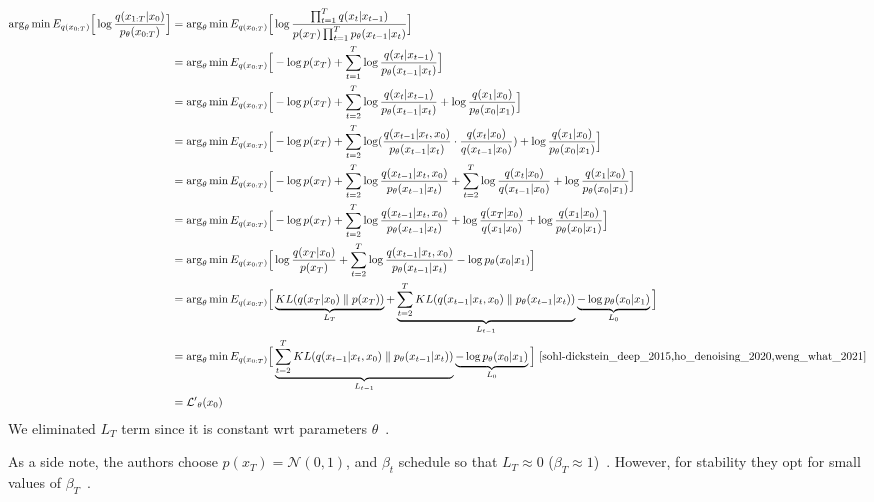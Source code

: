 \documentclass{article}
\numberwithin{equation}{subsection}
\begin{document}
\begin{align}
\arg_\theta \min E_{q(x_{0:T})}\Big[\log\frac{q(x_{1:T}|x_0)}{p_\theta(x_{0:T})}\Big] &= \arg_\theta \min E_{q(x_{0:T})}\Big[ \log\frac{\prod_{t=1}^T q(x_t|x_{t-1})}{ p(x_T) \prod_{t=1}^T p_\theta(x_{t-1} |x_t) }\Big] \\
&= \arg_\theta \min E_{q(x_{0:T})}\Big[ -\log p(x_T) + \sum_{t=1}^T \log \frac{q(x_t|x_{t-1})}{p_\theta(x_{t-1} |x_t)}\Big] \\
&= \arg_\theta \min E_{q(x_{0:T})}\Big[ -\log p(x_T) + \sum_{t=2}^T \log \frac{q(x_t|x_{t-1})}{p_\theta(x_{t-1} |x_t)} + \log\frac{q(x_1 |x_0)}{p_\theta(x_0 |x_1)}\Big]\\
&= \arg_\theta \min E_{q(x_{0:T})}\Big[ -\log p(x_T) + \sum_{t=2}^T \log ( \frac{q(x_{t-1} |x_t, x_0)}{p_\theta(x_{t-1} |x_t)}\cdot \frac{q(x_t |x_0)}{q(x_{t-1}|x_0)} ) + \log \frac{q(x_1 |x_0)}{p_\theta(x_0 |x_1)} \Big]\label{x0cond}\\
&= \arg_\theta \min E_{q(x_{0:T})}\Big[ -\log p(x_T) + \sum_{t=2}^T \log \frac{q(x_{t-1} |x_t, x_0)}{p_\theta(x_{t-1} |x_t)} + \sum_{t=2}^T \log \frac{q(x_t |x_0)}{q(x_{t-1} |x_0)} + \log\frac{q(x_1 |x_0)}{p_\theta(x_0 |x_1)}\Big] \\
&= \arg_\theta \min E_{q(x_{0:T})}\Big[-\log p(x_T) + \sum_{t=2}^T \log \frac{q(x_{t-1} |x_t, x_0)}{p_\theta(x_{t-1} |x_t)} + \log\frac{q(x_T |x_0)}{q(x_1 |x_0)} + \log \frac{q(x_1 |x_0)}{p_\theta(x_0 |x_1)}\Big]\\
&= \arg_\theta \min E_{q(x_{0:T})}\Big[\log\frac{q(x_T |x_0)}{p(x_T)} + \sum_{t=2}^T \log \frac{q(x_{t-1} |x_t, x_0)}{p_\theta(x_{t-1} |x_t)} - \log p_\theta(x_0 |x_1)\Big] \\
&= \arg_\theta \min E_{q(x_{0:T})}\Big[\underbrace{KL(q(x_T |x_0) \parallel p(x_T))}_{L_T} + \underbrace{\sum_{t=2}^T KL(q(x_{t-1} |x_t, x_0) \parallel p_\theta(x_{t-1} |x_t))}_{L_{t-1}} \underbrace{- \log p_\theta(x_0 |x_1)}_{L_0}\Big]\\
&= \arg_\theta \min E_{q(x_{0:T})}\Big[\underbrace{\sum_{t=2}^T KL(q(x_{t-1} |x_t, x_0) \parallel p_\theta(x_{t-1} |x_t))}_{L_{t-1}} \underbrace{- \log p_\theta(x_0 |x_1)}_{L_0}\Big]~\cite{sohl-dickstein_deep_2015,ho_denoising_2020,weng_what_2021}\\
&= \mathcal{L'}_\theta(x_0)
\end{align}
We eliminated $L_T$ term since it is constant wrt parameters $\theta$~\cite{weng_what_2021}. 

As a side note, the authors choose $p(x_T)=\mathcal{N}(0,1)$, and $\beta_t$ schedule so that $L_T \approx 0$ ($\beta_T \approx 1$)~\cite{ho_denoising_2020}. However, for stability they opt for small values of $\beta_T$~\cite{sohl-dickstein_deep_2015, ho_denoising_2020}.
\end{document}

